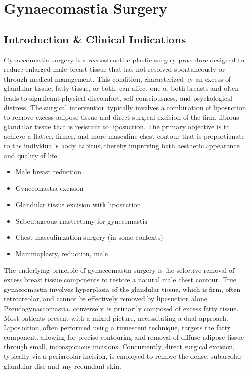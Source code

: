 \chapter{Gynaecomastia Surgery}

\section*{Introduction \& Clinical Indications}
Gynaecomastia surgery is a reconstructive plastic surgery procedure designed to reduce enlarged male breast tissue that has not resolved spontaneously or through medical management. This condition, characterized by an excess of glandular tissue, fatty tissue, or both, can affect one or both breasts and often leads to significant physical discomfort, self-consciousness, and psychological distress. The surgical intervention typically involves a combination of liposuction to remove excess adipose tissue and direct surgical excision of the firm, fibrous glandular tissue that is resistant to liposuction. The primary objective is to achieve a flatter, firmer, and more masculine chest contour that is proportionate to the individual's body habitus, thereby improving both aesthetic appearance and quality of life.

\begin{itemize}
  \item Male breast reduction
  \item Gynecomastia excision
  \item Glandular tissue excision with liposuction
  \item Subcutaneous mastectomy for gynecomastia
  \item Chest masculinization surgery (in some contexts)
  \item Mammaplasty, reduction, male
\end{itemize}

The underlying principle of gynaecomastia surgery is the selective removal of excess breast tissue components to restore a natural male chest contour. True gynaecomastia involves hyperplasia of the glandular tissue, which is firm, often retroareolar, and cannot be effectively removed by liposuction alone. Pseudogynaecomastia, conversely, is primarily composed of excess fatty tissue. Most patients present with a mixed picture, necessitating a dual approach. Liposuction, often performed using a tumescent technique, targets the fatty component, allowing for precise contouring and removal of diffuse adipose tissue through small, inconspicuous incisions. Concurrently, direct surgical excision, typically via a periareolar incision, is employed to remove the dense, subareolar glandular disc and any redundant skin.

